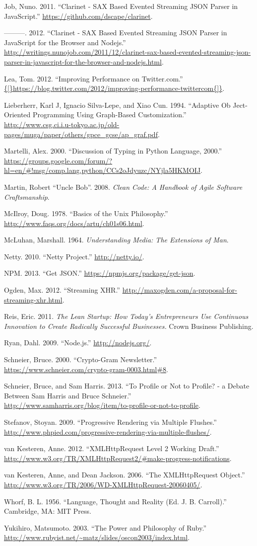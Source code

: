 \documentclass[12pt, ]{article}
\begin{document}
Job, Nuno. 2011. ``Clarinet - SAX Based Evented Streaming JSON Parser in
JavaScript.'' \url{https://github.com/dscape/clarinet}.

---------. 2012. ``Clarinet - SAX Based Evented Streaming JSON Parser in
JavaScript for the Browser and Nodejs.''
\url{http://writings.nunojob.com/2011/12/clarinet-sax-based-evented-streaming-json-parser-in-javascript-for-the-browser-and-nodejs.html}.

Lea, Tom. 2012. ``Improving Performance on Twitter.com.''
\url{{[}https://blog.twitter.com/2012/improving-performance-twittercom{]}}.

Lieberherr, Karl J, Ignacio Silva-Lepe, and Xiao Cun. 1994. ``Adaptive
Ob Ject-Oriented Programming Using Graph-Based Customization.''
\url{http://www.csg.ci.i.u-tokyo.ac.jp/old-pages/muga/paper/others/gpce_gcse/ap_graf.pdf}.

Martelli, Alex. 2000. ``Discussion of Typing in Python Language, 2000.''
\url{https://groups.google.com/forum/?hl=en/\#!msg/comp.lang.python/CCs2oJdyuzc/NYjla5HKMOIJ}.

Martin, Robert ``Uncle Bob''. 2008. \emph{Clean Code: A Handbook of
Agile Software Craftsmanship}.

McIlroy, Doug. 1978. ``Basics of the Unix Philosophy.''
\url{http://www.faqs.org/docs/artu/ch01s06.html}.

McLuhan, Marshall. 1964. \emph{Understanding Media: The Extensions of
Man}.

Netty. 2010. ``Netty Project.'' \url{http://netty.io/}.

NPM. 2013. ``Get JSON.'' \url{https://npmjs.org/package/get-json}.

Ogden, Max. 2012. ``Streaming XHR.''
\url{http://maxogden.com/a-proposal-for-streaming-xhr.html}.

Reis, Eric. 2011. \emph{The Lean Startup: How Today's Entrepreneurs Use
Continuous Innovation to Create Radically Successful Businesses.} Crown
Business Publishing.

Ryan, Dahl. 2009. ``Node.js.'' \url{http://nodejs.org/}.

Schneier, Bruce. 2000. ``Crypto-Gram Newsletter.''
\url{https://www.schneier.com/crypto-gram-0003.html\#8}.

Schneier, Bruce, and Sam Harris. 2013. ``To Profile or Not to Profile? -
a Debate Between Sam Harris and Bruce Schneier.''
\url{http://www.samharris.org/blog/item/to-profile-or-not-to-profile}.

Stefanov, Stoyan. 2009. ``Progressive Rendering via Multiple Flushes.''
\url{http://www.phpied.com/progressive-rendering-via-multiple-flushes/}.

van Kesteren, Anne. 2012. ``XMLHttpRequest Level 2 Working Draft.''
\url{http://www.w3.org/TR/XMLHttpRequest2/\#make-progress-notifications}.

van Kesteren, Anne, and Dean Jackson. 2006. ``The XMLHttpRequest
Object.'' \url{http://www.w3.org/TR/2006/WD-XMLHttpRequest-20060405/}.

Whorf, B. L. 1956. ``Language, Thought and Reality (Ed. J. B.
Carroll).'' Cambridge, MA: MIT Press.

Yukihiro, Matsumoto. 2003. ``The Power and Philosophy of Ruby.''
\url{http://www.rubyist.net/~matz/slides/oscon2003/index.html}.
\end{document}

